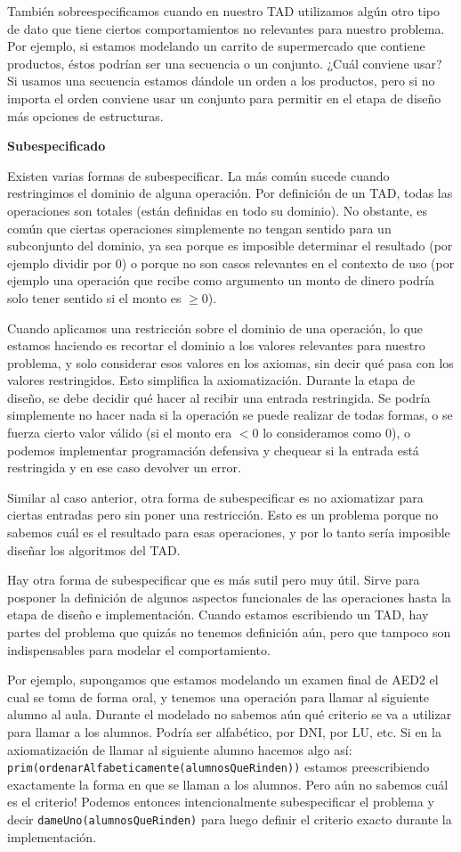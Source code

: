 También sobreespecificamos cuando en nuestro TAD utilizamos algún otro tipo de dato que tiene ciertos comportamientos no relevantes para nuestro problema. Por ejemplo, si estamos modelando un carrito de supermercado que contiene productos, éstos podrían ser una secuencia o un conjunto. ¿Cuál conviene usar? Si usamos una secuencia estamos dándole un orden a los productos, pero si no importa el orden conviene usar un conjunto para permitir en el etapa de diseño más opciones de estructuras.

\textbf{Subespecificado}

Existen varias formas de subespecificar. La más común sucede cuando restringimos el dominio de alguna operación. Por definición de un TAD, todas las operaciones son totales (están definidas en todo su dominio). No obstante, es común que ciertas operaciones simplemente no tengan sentido para un subconjunto del dominio, ya sea porque es imposible determinar el resultado (por ejemplo dividir por 0) o porque no son casos relevantes en el contexto de uso (por ejemplo una operación que recibe como argumento un monto de dinero podría solo tener sentido si el monto es $\geq 0$).

Cuando aplicamos una restricción sobre el dominio de una operación, lo que estamos haciendo es recortar el dominio a los valores relevantes para nuestro problema, y solo considerar esos valores en los axiomas, sin decir qué pasa con los valores restringidos. Esto simplifica la axiomatización. Durante la etapa de diseño, se debe decidir qué hacer al recibir una entrada restringida. Se podría simplemente no hacer nada si la operación se puede realizar de todas formas, o se fuerza cierto valor válido (si el monto era $< 0$ lo consideramos como 0), o podemos implementar programación defensiva y chequear si la entrada está restringida y en ese caso devolver un error.

Similar al caso anterior, otra forma de subespecificar es no axiomatizar para ciertas entradas pero sin poner una restricción. Esto es un problema porque no sabemos cuál es el resultado para esas operaciones, y por lo tanto sería imposible diseñar los algoritmos del TAD.

Hay otra forma de subespecificar que es más sutil pero muy útil. Sirve para posponer la definición de algunos aspectos funcionales de las operaciones hasta la etapa de diseño e implementación. Cuando estamos escribiendo un TAD, hay partes del problema que quizás no tenemos definición aún, pero que tampoco son indispensables para modelar el comportamiento.

Por ejemplo, supongamos que estamos modelando un examen final de AED2 el cual se toma de forma oral, y tenemos una operación para llamar al siguiente alumno al aula. Durante el modelado no sabemos aún qué criterio se va a utilizar para llamar a los alumnos. Podría ser alfabético, por DNI, por LU, etc. Si en la axiomatización de llamar al siguiente alumno hacemos algo así: \lstinline{prim(ordenarAlfabeticamente(alumnosQueRinden))} estamos preescribiendo exactamente la forma en que se llaman a los alumnos. Pero aún no sabemos cuál es el criterio! Podemos entonces intencionalmente subespecificar el problema y decir \lstinline{dameUno(alumnosQueRinden)} para luego definir el criterio exacto durante la implementación.
